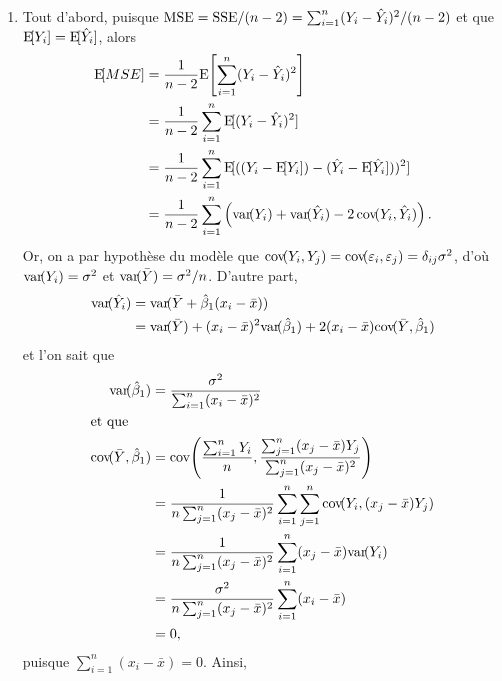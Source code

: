 \begin{solution}{2.8}
    \begin{enumerate}
    \item Tout d'abord, puisque $\mathrm{MSE} = \mathrm{SSE}/(n - 2) = \sum_{i=1}^n
      (Y_i - \hat{Y}_i)^2/(n - 2)$ et que $\mathrm{E}\! [ Y_i ] =
      \mathrm{E}\! [ \hat{Y}_i ]$, alors
      \begin{align*}
        \esp{MSE}
        &= \frac{1}{n - 2} \Esp{\sum_{i=1}^n (Y_i - \hat{Y}_i)^2} \\
        &= \frac{1}{n - 2} \sum_{i=1}^n \esp{(Y_i - \hat{Y}_i)^2} \\
        &= \frac{1}{n - 2} \sum_{i=1}^n \esp{((Y_i - \esp{Y_i}) -
          (\hat{Y}_i - \esp{\hat{Y}_i}))^2} \\
        &= \frac{1}{n - 2} \sum_{i=1}^n
        \left(
          \var{Y_i} + \var{\hat{Y}_i} - 2\, \cov{Y_i, \hat{Y}_i}
        \right).
      \end{align*}
      Or, on a par hypothèse du modèle que $\mathrm{cov}\! ( Y_i, Y_j ) =
      \mathrm{cov}\! ( \varepsilon_i, \varepsilon_j ) = \delta_{ij} \sigma^2$, d'où
      $\mathrm{var}\! ( Y_i ) = \sigma^2$ et $\mathrm{var}\! ( \bar{Y} ) = \sigma^2/n$. D'autre
      part,
      \begin{align*}
        \mathrm{var}\! ( \hat{Y}_i )
        &= \mathrm{var}\! ( \bar{Y} + \hat{\beta}_1 (x_i - \bar{x}) ) \\
        &= \mathrm{var}\! ( \bar{Y} ) + (x_i - \bar{x})^2 \mathrm{var}\! ( \hat{\beta}_1 ) +
        2 (x_i - \bar{x}) \mathrm{cov}\! ( \bar{Y}, \hat{\beta}_1 )
      \end{align*}
      et l'on sait que
      \begin{align*}
        \mathrm{var}\! ( \hat{\beta}_1 )
        &= \frac{\sigma^2}{\sum_{i=1}^n(x_i-\bar{x})^2} \\
        \intertext{et que}
        \mathrm{cov}\! ( \bar{Y}, \hat{\beta}_1 )
        & = \mathrm{cov}\! \left( 
          \frac{\sum_{i = 1}^n Y_i}{n},
          \frac{\sum_{j = 1}^n (x_j - \bar{x}) Y_j}{\sum_{j = 1}^n
            (x_j - \bar{x})^2} \right) \\
        &= \frac{1}{n \sum_{j = 1}^n (x_j - \bar{x})^2}
        \sum_{i = 1}^n \sum_{j = 1}^n \mathrm{cov}\! ( Y_i, (x_j - \bar{x}) Y_j ) \\
        &= \frac{1}{n \sum_{j = 1}^n (x_j - \bar{x})^2}
        \sum_{i = 1}^n (x_j - \bar{x}) \mathrm{var}\! ( Y_i ) \\
        & = \frac{\sigma^2}{n \sum_{j = 1}^n (x_j - \bar{x})^2}
        \sum_{i = 1}^n (x_i - \bar{x}) \\
        & = 0,
      \end{align*}
      puisque $\sum_{i=1}^n(x_i - \bar{x}) = 0$. Ainsi,

\end{enumerate}
\end{solution}
